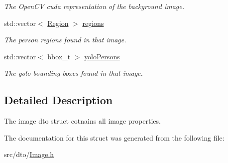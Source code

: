 \begin{DoxyCompactItemize}
\begin{DoxyCompactList}\small\item\em The Open\+CV cuda representation of the background image. \end{DoxyCompactList}\item 
\mbox{\label{structdto_1_1_image_ae9c1a7c8d0de66556d9d9a3d84505048}} 
std\+::vector$<$ \mbox{\hyperlink{structdto_1_1_region}{Region}} $>$ \mbox{\hyperlink{structdto_1_1_image_ae9c1a7c8d0de66556d9d9a3d84505048}{regions}}
\begin{DoxyCompactList}\small\item\em The person regions found in that image. \end{DoxyCompactList}\item 
\mbox{\label{structdto_1_1_image_a02c9c8a46b2a4518aef5eea78111bf49}} 
std\+::vector$<$ bbox\+\_\+t $>$ \mbox{\hyperlink{structdto_1_1_image_a02c9c8a46b2a4518aef5eea78111bf49}{yolo\+Persons}}
\begin{DoxyCompactList}\small\item\em The yolo bounding boxes found in that image. \end{DoxyCompactList}\end{DoxyCompactItemize}


\subsection{Detailed Description}
The image dto struct cotnains all image properties. 

The documentation for this struct was generated from the following file\+:\begin{DoxyCompactItemize}
\item 
src/dto/\mbox{\hyperlink{_image_8h}{Image.\+h}}\end{DoxyCompactItemize}

